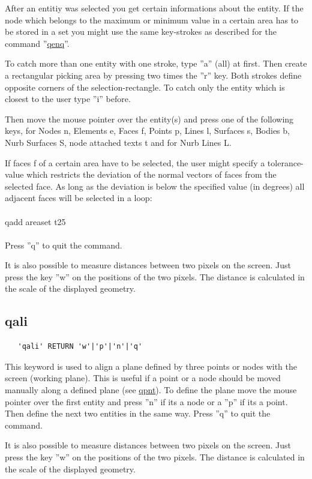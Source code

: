 \documentclass{article}
\providecommand{\htmlref}[2]{\hyperref[#2]{#1}}
\begin{document}
After an entitiy was selected you get certain informations about the entity. If the node which belongs to the maximum or minimum value in a certain area has to be stored in a set you might use the same key-strokes as described for the command ''\htmlref{qenq}{qenq}''.

To catch more than one entity with one stroke, type ''a'' (all) at first. Then create a rectangular picking area by pressing two times the ''r'' key. Both strokes define opposite corners of the selection-rectangle. To catch only the entity which is closest to the user type ''i'' before.

Then move the mouse pointer over the entity(s) and press one of the following keys, for Nodes n, Elements e, Faces f, Points p, Lines l, Surfaces s, Bodies b, Nurb Surfaces S, node attached texts t and for Nurb Lines L.

If faces f of a certain area have to be selected, the user might specify a tolerance-value which restricts the deviation of the normal vectors of faces from the selected face. As long as the deviation is below the specified value (in degrees) all adjacent faces will be selected in a loop:\\\\ qadd areaset t25\\\\

Press ''q'' to quit the command. 

It is also possible to measure distances between two pixels on the screen. Just press the key ''w'' on the positions of the two pixels. The distance is calculated in the scale of the displayed geometry.

\subsection{\label{qali}qali}
\begin{verbatim}
   'qali' RETURN 'w'|'p'|'n'|'q' 
\end{verbatim}
This keyword is used to align a plane defined by three points or nodes with the screen (working plane). This is useful if a point or a node should be moved manually along a defined plane (see \htmlref{qpnt}{qpnt}). To define the plane move the mouse pointer over the first entity and press ''n'' if its a node or a ''p'' if its a point. Then define the next two entities in the same way. Press ''q'' to quit the command. 

It is also possible to measure distances between two pixels on the screen. Just press the key ''w'' on the positions of the two pixels. The distance is calculated in the scale of the displayed geometry.
\end{document}
